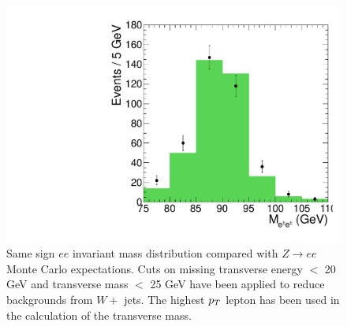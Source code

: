 \begin{figure}[h]
\begin{center}
\includegraphics[width=0.8\linewidth]{figs/qflip_data_mc_comp}
\caption{\label{fig:flipZee}
Same sign $ee$ invariant mass distribution compared with $Z \to ee$ Monte Carlo expectations.
Cuts on missing transverse energy $<$ 20 GeV and transverse mass
$<$ 25 GeV have been applied to reduce backgrounds from $W +$ jets.
The highest $p_T$ lepton has been used in the calculation of the transverse  mass.}
\end{center}
\end{figure}


